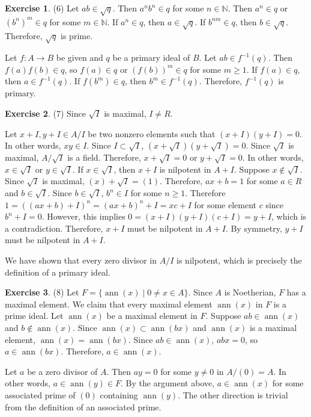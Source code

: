 \documentclass[12pt, psamsfonts]{amsart}
\theoremstyle{definition}
\newtheorem*{exer}{Exercise}
\theoremstyle{remark}
\DeclareMathOperator{\ann}{ann}
\numberwithin{equation}{section}
\begin{document}
\begin{exer}{(6)}
  Let $ab \in \sqrt{q}$.
  Then $a^nb^n \in q$ for some $n \in \mathbb{N}$.
  Then $a^n \in q$ or $(b^n)^m \in q$ for some $m \in \mathbb{N}$.
  If $a^n \in q$, then $a \in \sqrt{q}$.
  If $b^{nm} \in q$, then $b \in \sqrt{q}$.
  Therefore, $\sqrt{q}$ is prime.

  Let $f:A \rightarrow B$ be given and $q$ be a primary ideal of $B$.
  Let $ab \in f^{-1}(q)$.
  Then $f(a)f(b) \in q$, so $f(a) \in q$ or $(f(b))^m \in q$ for some $m \geq 1$.
  If $f(a) \in q$, then $a \in f^{-1}(q)$.
  If $f(b^m) \in q$, then $b^m \in f^{-1}(q)$.
  Therefore, $f^{-1}(q)$ is primary.
\end{exer}

\begin{exer}{(7)}
  Since $\sqrt{I}$ is maximal, $I \ne R$.

  Let $x + I, y + I \in A / I$ be two nonzero elements such that $(x + I)(y + I) = 0$.
  In other words, $xy \in I$.
  Since $I \subset \sqrt{I}$, $(x + \sqrt{I})(y + \sqrt{I}) = 0$.
  Since $\sqrt{I}$ is maximal, $A / \sqrt{I}$ is a field.
  Therefore, $x + \sqrt{I} = 0$ or $y + \sqrt{I} = 0$.
  In other words, $x \in \sqrt{I}$ or $y \in \sqrt{I}$.
  If $x \in \sqrt{I}$, then $x + I$ is nilpotent in $A + I$.
  Suppose $x \notin \sqrt{I}$.
  Since $\sqrt{I}$ is maximal, $(x) + \sqrt{I} = (1)$.
  Therefore, $ax + b = 1$ for some $a \in R$ and $b \in \sqrt{I}$.
  Since $b \in \sqrt{I}$, $b^n \in I$ for some $n \geq 1$.
  Therefore $1 = ((ax + b) + I)^n = (ax + b)^n + I = xc + I$ for some element $c$ since $b^n + I = 0$.
  However, this implies $0 = (x + I)(y + I)(c + I) = y + I$, which is a contradiction.
  Therefore, $x + I$ must be nilpotent in $A + I$.
  By symmetry, $y + I$ must be nilpotent in $A + I$.
  
  We have shown that every zero divisor in $A / I$ is nilpotent, which is precisely the definition of a primary ideal.
\end{exer}

\begin{exer}{(8)}
  Let $F = \{ \ann(x) \mid 0 \ne x \in A \}$.
  Since $A$ is Noetherian, $F$ has a maximal element.
  We claim that every maximal element $\ann(x)$ in $F$ is a prime ideal.
  Let $\ann(x)$ be a maximal element in $F$.
  Suppose $ab \in \ann(x)$ and $b \notin \ann(x)$.
  Since $\ann(x) \subset \ann(bx)$ and $\ann(x)$ is a maximal element, $\ann(x) = \ann(bx)$.
  Since $ab \in \ann(x)$, $abx = 0$, so $a \in \ann(bx)$.
  Therefore, $a \in \ann(x)$.

  Let $a$ be a zero divisor of $A$.
  Then $ay = 0$ for some $y \ne 0$ in $A / (0) = A$.
  In other words, $a \in \ann(y) \in F$.
  By the argument above, $a \in \ann(x)$ for some associated prime of $(0)$ containing $\ann(y)$.
  The other direction is trivial from the definition of an associated prime.
\end{exer}
\end{document}

